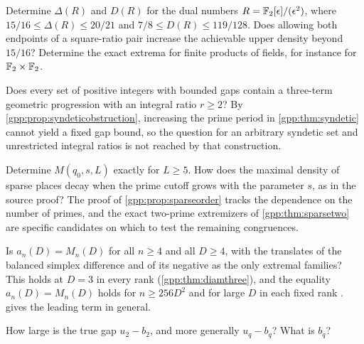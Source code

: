 \begin{question}\label{gpp:q:dual}
Determine $\Delta(R)$ and $D(R)$ for the dual numbers
$R=\mathbb{F}_2[\epsilon]/(\epsilon^2)$, where $15/16\le\Delta(R)\le20/21$ and
$7/8\le D(R)\le119/128$. Does allowing both endpoints of a square-ratio pair increase
the achievable upper density beyond $15/16$? Determine the exact extrema for finite
products of fields, for instance for $\mathbb{F}_2\times\mathbb{F}_2$.
\end{question}

\begin{question}\label{gpp:q:syndetic}
Does every set of positive integers with bounded gaps contain a three-term geometric
progression with an integral ratio $r\ge2$? By \cref{gpp:prop:syndeticobstruction},
increasing the prime period in \cref{gpp:thm:syndetic} cannot yield a fixed gap bound, so
the question for an arbitrary syndetic set and unrestricted integral ratios is not
reached by that construction.
\end{question}

\begin{question}\label{gpp:q:sparse}
Determine $M(q_0,s,L)$ exactly for $L\ge5$. How does the maximal density of sparse
places decay when the prime cutoff grows with the parameter $s$, as in the source proof?
The proof of \cref{gpp:prop:sparseorder} tracks the dependence on the number of primes,
and the exact two-prime extremizers of \cref{gpp:thm:sparsetwo} are specific candidates
on which to test the remaining congruences.
\end{question}

\begin{question}[Anticodes in $A_n$]\label{gpp:q:anticodes}
Is $a_n(D)=M_n(D)$ for all $n\ge4$ and all $D\ge4$, with the translates of the balanced
simplex difference and of its negative as the only extremal families? This holds at $D=3$
in every rank (\cref{gpp:thm:diamthree}), and the equality $a_n(D)=M_n(D)$ holds for
$n\ge256D^2$ and for large $D$ in each fixed rank \cite[Theorems~3.2--3.4]{Schubr2026Maximum}.  gives
the leading term in general.
\end{question}

\begin{question}
How large is the true gap $u_2-b_2$, and more generally
 $u_q-b_q$? What is $b_q$?
\end{question}
